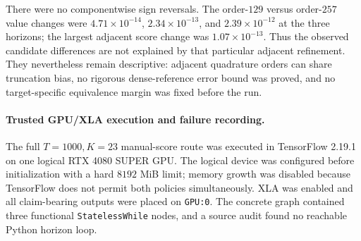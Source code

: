 \begin{table}[H]
\centering
\caption{Descriptive candidate-minus-order-257 dense-reference comparisons.
No scientific-equivalence threshold was declared.}
\label{tab:bf-ledh-actual-sv-dense-comparison}
\end{table}

There were no componentwise sign reversals.  The order-\(129\) versus
order-\(257\) value changes were \(4.71\times10^{-14}\),
\(2.34\times10^{-13}\), and \(2.39\times10^{-12}\) at the three horizons; the
largest adjacent score change was \(1.07\times10^{-13}\).  Thus the observed
candidate differences are not explained by that particular adjacent
refinement.  They nevertheless remain descriptive: adjacent quadrature orders
can share truncation bias, no rigorous dense-reference error bound was proved,
and no target-specific equivalence margin was fixed before the run.

\paragraph{Trusted GPU/XLA execution and failure recording.}
The full \(T=1000,K=23\) manual-score route was executed in TensorFlow 2.19.1
on one logical RTX 4080 SUPER GPU.  The logical device was configured before
initialization with a hard \(8192\) MiB limit; memory growth was disabled
because TensorFlow does not permit both policies simultaneously.  XLA was
enabled and all claim-bearing outputs were placed on \texttt{GPU:0}.  The
concrete graph contained three functional \texttt{StatelessWhile} nodes, and a
source audit found no reachable Python horizon loop.

